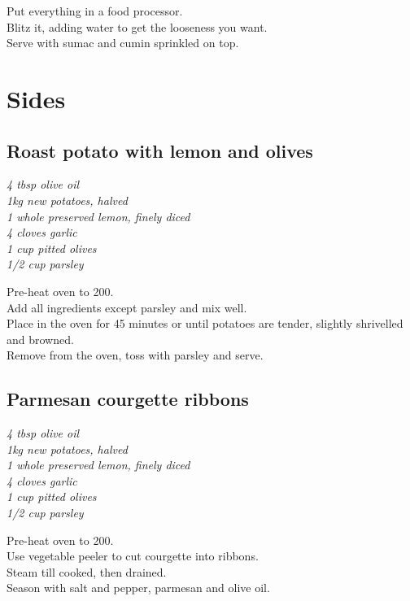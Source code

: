 \documentclass{tufte-book}
\begin{document}
Put everything in a food processor.
\\Blitz it, adding water to get the looseness you want. 
\\Serve with sumac and cumin sprinkled on top.

\chapter{Sides}
\section{Roast potato with lemon and olives}

\emph{4 tbsp olive oil
\\1kg new potatoes, halved
\\1 whole preserved lemon, finely diced
\\4 cloves garlic
\\1 cup pitted olives
\\1/2 cup parsley
}

Pre-heat oven to 200\celsius.
\\Add all ingredients except parsley and mix well.
\\Place in the oven for 45 minutes or until potatoes are tender, slightly shrivelled and browned. 
\\Remove from the oven, toss with parsley and serve.


\section{Parmesan courgette ribbons}

\emph{4 tbsp olive oil
\\1kg new potatoes, halved
\\1 whole preserved lemon, finely diced
\\4 cloves garlic
\\1 cup pitted olives
\\1/2 cup parsley
}

Pre-heat oven to 200\celsius.
\\Use vegetable peeler to cut courgette into ribbons.
\\Steam till cooked, then drained.
\\Season with salt and pepper, parmesan and olive oil.
\end{document}
